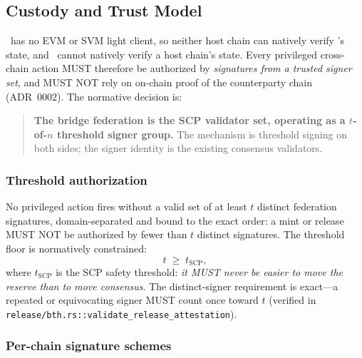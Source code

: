 \subsection{Custody and Trust Model}
\label{sec:bridge:custody}

\Botho\ has no EVM or SVM light client, so neither host chain can natively
verify \Botho's state, and \Botho\ cannot natively verify a host chain's
state. Every privileged cross-chain action MUST therefore be authorized by
\emph{signatures from a trusted signer set}, and MUST NOT rely on on-chain proof
of the counterparty chain (ADR~0002). The normative decision is:

\begin{quote}
\textbf{The bridge federation is the SCP validator set, operating as a
$t$-of-$n$ threshold signer group.} The mechanism is threshold signing on both
sides; the signer identity is the existing consensus validators.
\end{quote}

\subsubsection{Threshold authorization}

No privileged action fires without a valid set of at least $t$ distinct
federation signatures, domain-separated and bound to the exact order: a mint or
release MUST NOT be authorized by fewer than $t$ distinct signatures. The
threshold floor is normatively constrained:
\begin{equation}
\label{eq:bridge:threshold}
t \;\geq\; t_{\mathrm{SCP}},
\end{equation}
where $t_{\mathrm{SCP}}$ is the SCP safety threshold: \emph{it MUST never be
easier to move the reserve than to move consensus}.
The distinct-signer requirement is exact---a repeated or equivocating signer
MUST count once toward $t$
(verified in \texttt{release/bth.rs::validate\_release\_attestation}).

\subsubsection{Per-chain signature schemes}

